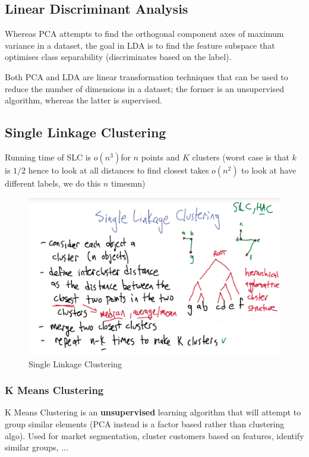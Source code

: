 \documentclass[11pt]{article}
\begin{document}
\subsection{Linear Discriminant Analysis}
Whereas PCA attempts to find the orthogonal component axes of maximum variance in a dataset, the goal in LDA is to find the feature subspace that optimises class separability (discriminates based on the label).

Both PCA and LDA are linear transformation techniques that can be used to reduce the number of dimensions in a dataset; the former is an unsupervised algorithm, whereas the latter is supervised.

\subsection{Single Linkage Clustering}
Running time of SLC is $o(n^3)$for $n$ points and $K$ clusters (worst case is that $k$ is $1/2$ hence to look at all distances to find closest takes $o(n^2)$ to look at have different labels, we do this $n$ timesmn)

\begin{figure}[htbp] 
	\centering
	\includegraphics[width=.9\textwidth]{pics/SLC}
	\caption{Single Linkage Clustering} 
	\label{SLC}
\end{figure}

\subsubsection{K Means Clustering}
K Means Clustering is an \textbf{unsupervised} learning algorithm that will attempt to group similar elements (PCA instead is a factor based rather than clustering algo). Used for market segmentation, cluster customers based on features, identify similar groups, ...
\end{document}
